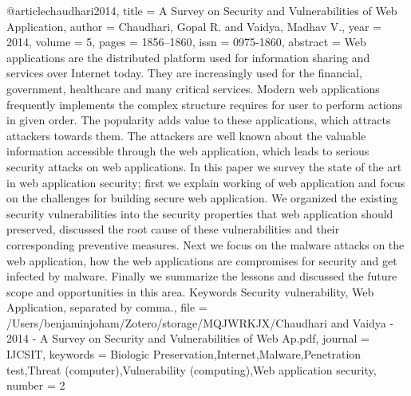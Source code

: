 
@article{chaudhari2014,
  title = {A {{Survey}} on {{Security}} and {{Vulnerabilities}} of {{Web Application}}},
  author = {Chaudhari, Gopal R. and Vaidya, Madhav V.},
  year = {2014},
  volume = {5},
  pages = {1856--1860},
  issn = {0975-1860},
  abstract = {Web applications are the distributed platform used for information sharing and services over Internet today. They are increasingly used for the financial, government, healthcare and many critical services. Modern web applications frequently implements the complex structure requires for user to perform actions in given order. The popularity adds value to these applications, which attracts attackers towards them. The attackers are well known about the valuable information accessible through the web application, which leads to serious security attacks on web applications. In this paper we survey the state of the art in web application security; first we explain working of web application and focus on the challenges for building secure web application. We organized the existing security vulnerabilities into the security properties that web application should preserved, discussed the root cause of these vulnerabilities and their corresponding preventive measures. Next we focus on the malware attacks on the web application, how the web applications are compromises for security and get infected by malware. Finally we summarize the lessons and discussed the future scope and opportunities in this area. Keywords\textemdash{} Security vulnerability, Web Application, separated by comma.},
  file = {/Users/benjaminjoham/Zotero/storage/MQJWRKJX/Chaudhari and Vaidya - 2014 - A Survey on Security and Vulnerabilities of Web Ap.pdf},
  journal = {IJCSIT},
  keywords = {Biologic Preservation,Internet,Malware,Penetration test,Threat (computer),Vulnerability (computing),Web application security},
  number = {2}
}

